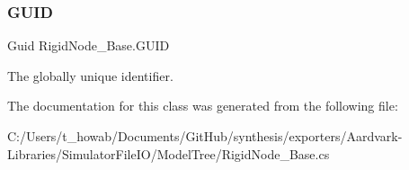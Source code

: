 \subsubsection{\texorpdfstring{G\+U\+ID}{GUID}}
{\footnotesize\ttfamily Guid Rigid\+Node\+\_\+\+Base.\+G\+U\+ID\hspace{0.3cm}{\ttfamily [get]}}



The globally unique identifier. 



The documentation for this class was generated from the following file\+:\begin{DoxyCompactItemize}
\item 
C\+:/\+Users/t\+\_\+howab/\+Documents/\+Git\+Hub/synthesis/exporters/\+Aardvark-\/\+Libraries/\+Simulator\+File\+I\+O/\+Model\+Tree/Rigid\+Node\+\_\+\+Base.\+cs\end{DoxyCompactItemize}
